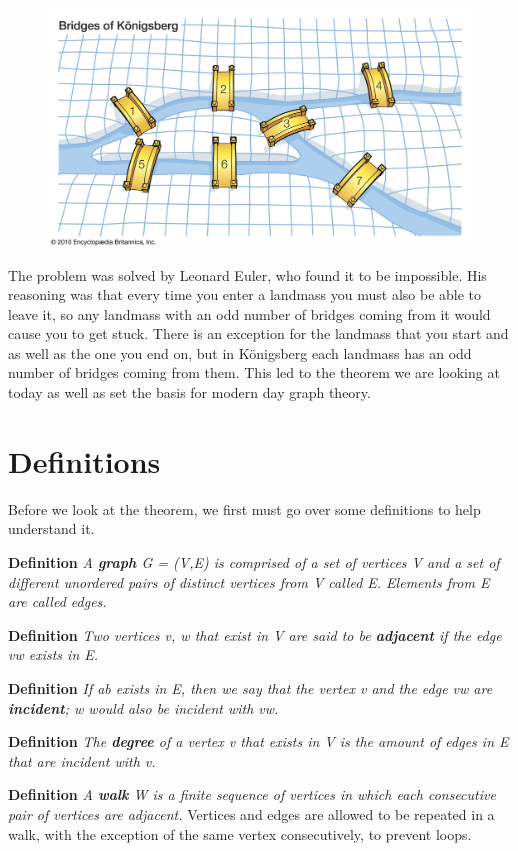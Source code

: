 \documentclass[10pt]{amsart}
\begin{document}
\begin{figure}[h!]
\centerline{
{\includegraphics[width=.7\textwidth]{pictures/bridge_pic.png}}}\label{bridge}
\end{figure} 

The problem was solved by Leonard Euler, who found it to be impossible. His reasoning was that 
every time you enter a landmass you must also be able to leave it, so any landmass with an odd
number of bridges coming from it would cause you to get stuck. There is an exception for the landmass
that you start and as well as the one you end on, but in K\"{o}nigsberg each landmass has an odd 
number of bridges coming from them. This led to the theorem we are looking at today as well as 
set the basis for modern day graph theory.

\section{Definitions}
\noindent
Before we look at the theorem, we first must go over some definitions to help understand it.

\noindent
\textbf{Definition} 
\emph{
    A \textbf{graph} G = (V,E) is comprised of a set of vertices V and a set of 
    different unordered pairs of distinct vertices from V called E. Elements from E are called edges.
}

\noindent
\textbf{Definition} 
\emph{
    Two vertices v, w that exist in V are said to be \textbf{adjacent} if the
    edge vw exists in E.
}

\noindent
\textbf{Definition}
\emph{
    If ab exists in E, then we say that the vertex v and the edge vw are \textbf{incident}; w would
    also be incident with vw.
}

\noindent
\textbf{Definition}
\emph{
    The \textbf{degree} of a vertex v that exists in V is the amount of edges in E that are incident
    with v.
}

\noindent
\textbf{Definition}
\emph{
    A \textbf{walk} W is a finite sequence of vertices in which each consecutive pair of vertices
    are adjacent.
}
Vertices and edges are allowed to be repeated in a walk, with the exception of the same vertex consecutively,
to prevent loops.
\end{document}

